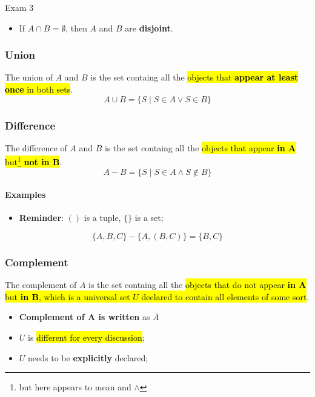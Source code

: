 \documentclass{note}
\newcommand{\intersect}{\cap}
\newcommand{\union}{\cup}
\begin{document}
\begin{note}{Exam 3}
        \begin{itemize}
            \item If $ A \intersect B = \emptyset $, then $ A $ and $ B $ are \textbf{disjoint}.
        \end{itemize}

        \subsubsection{Union}
        The union of $ A $ and $ B $ is the set containg all the \hl{objects that \textbf{appear at least once} in both sets}.
        \begin{equation}\label{eq: union}
            A \union B = \{ S \mid S \in A \vee S \in B \}
        \end{equation}

        \subsubsection{Difference}
        The difference of $ A $ and $ B $ is the set containg all the \hl{objects that appear \textbf{in A} but\footnote{but here appears
        to mean and $ \wedge $} \textbf{not in B}}.
        \begin{equation}\label{eq: difference}
            A - B = \{ S \mid S \in A \wedge S \not\in B \}
        \end{equation}

        \paragraph{Examples}

        \begin{itemize}
            \item \textbf{Reminder}: $ () $ is a tuple, $ \{\} $ is a set;
        \end{itemize}

        \begin{displaymath}
            \{ A, B, C \} - \{ A, (B, C)  \} = \{ B, C \}
        \end{displaymath}

        \subsubsection{Complement}
        The complement of $ A $ is the set containg all the \hl{objects that do not appear \textbf{in A} but \textbf{in B},
        which is a universal set $ U $ declared to contain all elements of some sort}.
        \begin{itemize}
            \item \textbf{Complement of A is written} as $ \overline{A} $
            \item $ U $ is \hl{different for every discussion};
            \item $ U $ needs to be \textbf{explicitly} declared;
        \end{itemize}


\end{note}
\end{document}
